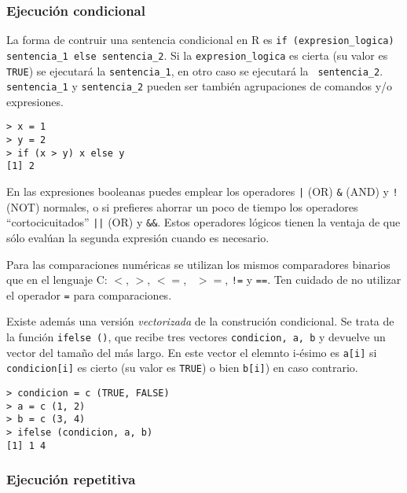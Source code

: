 \subsubsection*{Ejecución condicional}


La  forma  de  contruir  una  sentencia  condicional  en  {\sf  R}  es
{\tt  if (expresion\_logica)  sentencia\_1 else  sentencia\_2}. Si  la
{\tt  expresion\_logica}  es  cierta  (su  valor  es  {\tt  TRUE})  se
ejecutará la  {\tt sentencia\_1},  en otro caso  se ejecutará  la {\tt
sentencia\_2}.  {\tt sentencia\_1}  y  {\tt  sentencia\_2} pueden  ser
también agrupaciones de comandos y/o expresiones.

\begin{verbatim}
> x = 1      
> y = 2
> if (x > y) x else y
[1] 2
\end{verbatim}

En las  expresiones booleanas  puedes emplear  los operadores  {\tt |}
(OR) {\tt \&}  (AND) y {\tt !} (NOT) normales,  o si prefieres ahorrar
un poco de  tiempo los operadores ``cortocicuitados'' {\tt  ||} (OR) y
{\tt  \&\&}.     Estos
operadores lógicos  tienen la ventaja  de que sólo evalúan  la segunda
expresión cuando es necesario.

Para las  comparaciones numéricas se utilizan  los mismos comparadores
binarios que en el lenguaje C:  {\tt $<$}, {\tt $>$}, {\tt $<=$}, {\tt
$>=$}, {\tt  !=} y {\tt  ==}. Ten cuidado  de no utilizar  el operador
{\tt =} para comparaciones.


Existe  además  una  versión   {\em  vectorizada}  de  la  construción
condicional. Se trata  de la función {\tt ifelse ()},  que recibe tres
vectores {\tt condicion, a, b} y devuelve un vector del tamaño del más
largo.  En este  vector  el  elemnto i-ésimo  es  {\tt  a[i]} si  {\tt
condicion[i]} es cierto (su valor es {\tt TRUE}) o bien {\tt b[i]}) en
caso contrario.

\begin{verbatim}
> condicion = c (TRUE, FALSE)
> a = c (1, 2)
> b = c (3, 4)
> ifelse (condicion, a, b)
[1] 1 4
\end{verbatim}

\subsubsection*{Ejecución repetitiva}

